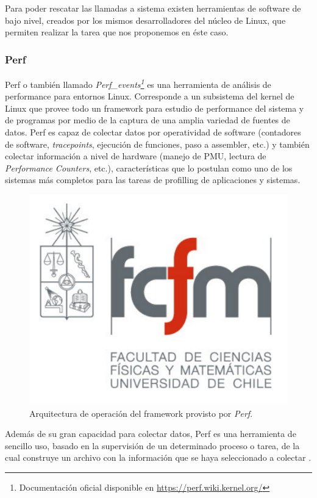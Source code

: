 Para poder rescatar las llamadas a sistema existen herramientas de software de bajo nivel, creados por los mismos desarrolladores del núcleo de Linux, que permiten realizar la tarea que nos proponemos en éste caso.

\subsubsection{Perf}
Perf \cite{slides:perfTools} o también llamado \emph{Perf\_events\footnote{Documentación oficial disponible en \url{https://perf.wiki.kernel.org/}}} es una herramienta de análisis de performance para entornos Linux. Corresponde a un subsistema del kernel de Linux que provee todo un framework para estudio de performance del sistema y de programas por medio de la captura de una amplia variedad de fuentes de datos. Perf es capaz de colectar datos por operatividad de software (contadores de software, \emph{tracepoints}, ejecución de funciones, paso a assembler, etc.) y también colectar información a nivel de hardware (manejo de PMU, lectura de \emph{Performance Counters}, etc.), características que lo postulan como uno de los sistemas más completos para las tareas de profilling de aplicaciones y sistemas.

\begin{figure}[!h]
	\centering
	\includegraphics[scale=.3]{imagenes/fcfm}
	\caption{Arquitectura de operación del framework provisto por \emph{Perf}.}
	\label{fig:perfFramework}
\end{figure}

Además de su gran capacidad para colectar datos, Perf es una herramienta de sencillo uso, basado en la supervisión de un determinado proceso o tarea, de la cual construye un archivo con la información que se haya seleccionado a colectar \cite{article:perf}.

